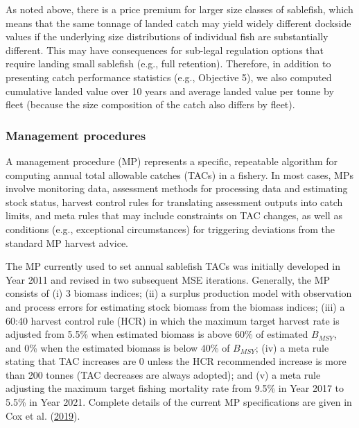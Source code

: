 \documentclass[11pt]{book}
\begin{document}
As noted above, there is a price premium for larger size classes of sablefish, which means that the same tonnage of landed catch may yield widely different dockside values if the underlying size distributions of individual fish are substantially different. This may have consequences for sub-legal regulation options that require landing small sablefish (e.g., full retention). Therefore, in addition to presenting catch performance statistics (e.g., Objective 5), we also computed cumulative landed value over 10 years and average landed value per tonne by fleet (because the size composition of the catch also differs by fleet).

\hypertarget{management-procedures}{%
\subsubsection{Management procedures}\label{management-procedures}}

A management procedure (MP) represents a specific, repeatable algorithm for computing annual total allowable catches (TACs) in a fishery. In most cases, MPs involve monitoring data, assessment methods for processing data and estimating stock status, harvest control rules for translating assessment outputs into catch limits, and meta rules that may include constraints on TAC changes, as well as conditions (e.g., exceptional circumstances) for triggering deviations from the standard MP harvest advice.

The MP currently used to set annual sablefish TACs was initially developed in Year 2011 and revised in two subsequent MSE iterations. Generally, the MP consists of (i) 3 biomass indices; (ii) a surplus production model with observation and process errors for estimating stock biomass from the biomass indices; (iii) a 60:40 harvest control rule (HCR) in which the maximum target harvest rate is adjusted from 5.5\% when estimated biomass is above 60\% of estimated \(B_{MSY}\), and 0\% when the estimated biomass is below 40\% of \(B_{MSY}\); (iv) a meta rule stating that TAC increases are 0 unless the HCR recommended increase is more than 200 tonnes (TAC decreases are always adopted); and (v) a meta rule adjusting the maximum target fishing mortality rate from 9.5\% in Year 2017 to 5.5\% in Year 2021. Complete details of the current MP specifications are given in Cox et al. (\protect\hyperlink{ref-cox2019evaluating}{2019}).
\end{document}
